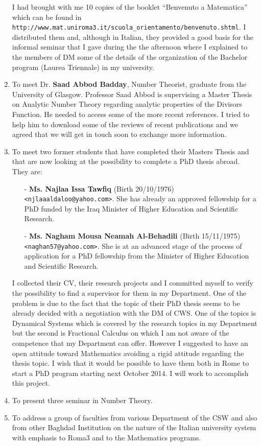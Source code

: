 \documentclass[12pt,a4paper]{scrartcl}
\begin{document}
\begin{enumerate}
I had brought with me 10 copies of the booklet ``Benvenuto a Matematica'' which can
 be found in \texttt{http://www.mat.uniroma3.it/scuola\_orientamento/benvenuto.shtml}. I distributed them and, although in Italian, they provided
 a good basis for the informal seminar that I gave during the the afternoon where I explained to the members of DM some of the details of the
 organization of the Bachelor program (Laurea Triennale) in my university. 
 \item To meet Dr. \textbf{Saad Abbod Badday}, Number Theorist, graduate from the University of Glasgow. 
 Professor Saad Abbod is supervising
 a Master Thesis on Analytic Number Theory regarding analytic properties of the Divisors Function. He needed to access some of the more recent
 references. I tried to help him to download some of the reviews of recent publications and we agreed that we will get in touch soon to exchange more
 information.
 \item To meet two former students that have completed their Masters Thesis and that are now looking at the possibility to complete a PhD thesis abroad.
 They are:
 \begin{itemize}\itemsep2pt
  \item[-] \textbf{Ms. Najlaa Issa Tawfiq} (Birth 20/10/1976) \texttt{<njlaaaldaloo@yahoo.com>}. She has already an approved fellowship for a PhD funded by the Iraq
  Minister of Higher Education and Scientific Research. 
  \item[-] \textbf{Ms. Nagham Mousa Neamah Al-Behadili} (Birth 15/11/1975) \texttt{<naghan57@yahoo.com>}. 
  She is at an advanced stage of the process of application for a PhD
  fellowship from the Minister of Higher Education and Scientific Research.
 \end{itemize}
I collected their CV, their research projects and I committed myself to verify the possibility to find a supervisor for them in my Department. One of the problem
is due to the fact that the topic of their PhD thesis seems to be already decided with a negotiation with the DM of CWS. One of the topics is
Dynamical Systems which is covered by the research topics in my Department but the second is Fractional Calculus on which I am not aware of the 
competence that my Department can offer. However I suggested to have an open attitude toward Mathematics avoiding a rigid attitude regarding the thesis topic.
I wish that it would be possible to have them both in Rome to start a PhD program starting next October 2014. I will work to accomplish this project.

 \item To present three seminar in Number Theory.

 \item To address a group of faculties from various Department of the CSW and also from other Baghdad Institution on the nature of the Italian
 university system with emphasis to Roma3 and to the Mathematics programs. 
\end{enumerate}
\end{document}
